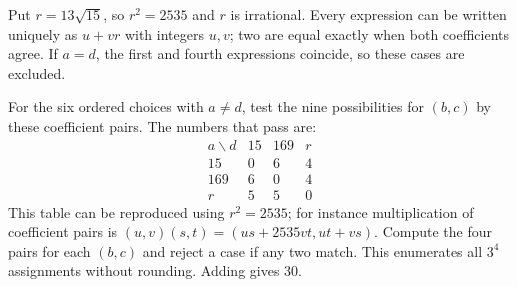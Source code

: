 Put $r=13\sqrt{15}$, so $r^2=2535$ and $r$ is irrational. Every expression can be written uniquely as $u+vr$ with integers $u,v$; two are equal exactly when both coefficients agree. If $a=d$, the first and fourth expressions coincide, so these cases are excluded.

For the six ordered choices with $a\ne d$, test the nine possibilities for $(b,c)$ by these coefficient pairs. The numbers that pass are:
\[
\begin{array}{c|rrr}
a\backslash d&15&169&r\\ \hline
15&0&6&4\\
169&6&0&4\\
r&5&5&0
\end{array}
\]
This table can be reproduced using $r^2=2535$; for instance multiplication of coefficient pairs is $(u,v)(s,t)=(us+2535vt,ut+vs)$. Compute the four pairs for each $(b,c)$ and reject a case if any two match. This enumerates all $3^4$ assignments without rounding. Adding gives $\boxed{30}$.
